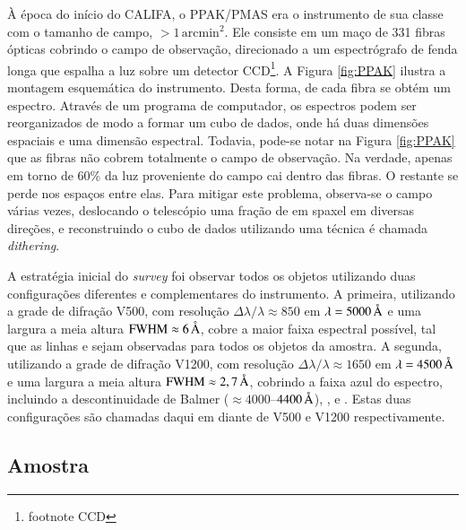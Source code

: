 À época do início do CALIFA, o PPAK/PMAS era o instrumento de sua classe com o
tamanho de campo, $>1\,\mathrm{arcmin}^2$. Ele consiste em um maço de 331 fibras
ópticas cobrindo o campo de observação, direcionado a um espectrógrafo de fenda
longa que espalha a luz sobre um detector CCD\footnote{\TODO footnote CCD}. A
Figura \ref{fig:PPAK} ilustra a montagem esquemática do instrumento.
Desta forma, de cada fibra se obtém um espectro. Através de um programa de
computador, os espectros podem ser reorganizados de modo a formar um cubo de
dados, onde há duas dimensões espaciais e uma dimensão espectral. Todavia,
pode-se notar na Figura \ref{fig:PPAK} que as fibras não cobrem totalmente o
campo de observação. Na verdade, apenas em torno de 60\% da luz proveniente do
campo cai dentro das fibras. O restante se perde nos espaços entre elas. Para
mitigar este problema, observa-se o campo várias vezes, deslocando o telescópio
uma fração de {em spaxel} em diversas direções, e reconstruindo o cubo de dados
utilizando uma técnica é chamada {\em dithering}.

A estratégia inicial do {\em survey} foi observar todos os objetos utilizando
duas configurações diferentes e complementares do instrumento. A primeira,
utilizando a grade de difração V500, com resolução $\Delta \lambda / \lambda
\approx 850$ em $\lambda = 5000\,\text{\normalfont\AA}$ e uma largura a meia altura
$\mathrm{FWHM} \approx 6\,\text{\normalfont\AA}$, cobre a maior faixa espectral possível,
tal que as linhas \OII e \SII sejam observadas para todos os objetos da amostra.
A segunda, utilizando a grade de difração V1200, com resolução $\Delta \lambda /
\lambda \approx 1650$ em $\lambda = 4500\,\text{\normalfont\AA}$ e uma largura a meia altura
$\mathrm{FWHM} \approx 2,7\,\text{\normalfont\AA}$, cobrindo a faixa azul do espectro,
incluindo a descontinuidade de Balmer ($\approx 4000$--$4400\,\text{\normalfont\AA}$),
\Hdelta, \Hgamma e . Estas duas configurações são chamadas daqui em
diante de V500 e V1200 respectivamente.

\subsection{Amostra}


